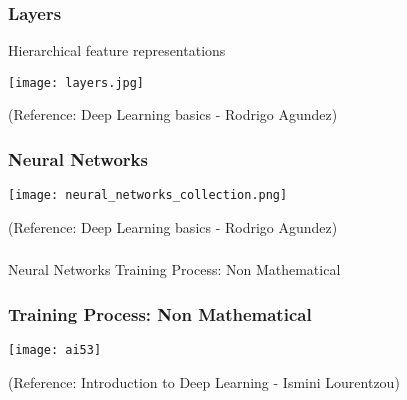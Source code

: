 \begin{frame}[fragile] \frametitle{Layers}

Hierarchical feature representations

\begin{center}
\texttt{[image: layers.jpg]}

\end{center}

\tiny{(Reference: Deep Learning basics - Rodrigo Agundez)}

\end{frame}

\begin{frame}[fragile] \frametitle{Neural Networks}

\begin{center}
\texttt{[image: neural\_networks\_collection.png]}

\end{center}

\tiny{(Reference: Deep Learning basics - Rodrigo Agundez)}

\end{frame}


\begin{frame}[fragile]\frametitle{}
\begin{center}
{\Large Neural Networks Training Process: Non Mathematical}
\end{center}
\end{frame}




\begin{frame}[fragile] \frametitle{Training Process: Non Mathematical}
\begin{center}
\texttt{[image: ai53]}
\end{center}
\tiny{(Reference: Introduction to Deep Learning - Ismini Lourentzou)}
\end{frame}




